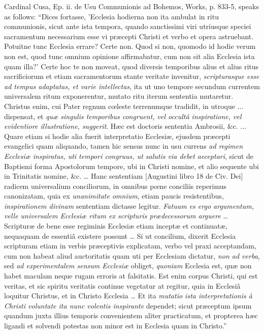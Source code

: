 {Cardinal Cusa, Ep. ii. de Usu Communionis ad Bohemos,
Works, p. 833-5, speaks as follows: ``Dices fortasse, 'Ecclesia
hodierna non ita ambulat in ritu communionis, sicut ante ista tempora,
quando sanctissimi viri utriusque speciei sacramentum necessarium esse
vi præcepti Christi et verbo et opera astruebant. Potuitne tunc
Ecclesia errare? Certe non. Quod si non, quomodo id hodie verum non
est, quod tunc omnium opinione affirmabatur, cum non sit alia Ecclesia
ista quam illa?' Certe hoc te non moveat, quod diversis temporibus
alius et alius ritus sacrificiorum et etiam sacramentorum stante
veritate invenitur, \emph{scripturasque esse ad tempus adaptatas, et
varie intellectas}, ita ut uno tempore secundum currentem
universalem ritum exponerentur, mutato ritu iterum sententia mutaretur.
Christus enim, cui Pater regnum cœleste terrenumque tradidit, in
utroque ... dispensat, et \emph{quæ singulis temporibus congruent, vel
occultâ inspiratione, vel evidentiore illustratione, suggerit}.
Hæc est doctoris sententia Ambrosii, \&c. ... Quare etiam si hodie
alia fuerit interpretatio Ecclesiæ, ejusdem præcepti evangelici quam
aliquando, tamen hic sensus nunc in usu currens \emph{ad regimen
Ecclesiæ inspiratus, uti tempori congruus, ut salutis via debet
aeceptari}, sicut de Baptismi forma Apostolorum tempore, ubi in
Christi nomine, et alio sequente ubi in Trinitatis nomine, \&c. …
Hanc sententiam [Augustini libro 18 de Civ. Dei] radicem universalium
conciliorum, in omnibus pœne conciliis reperimus canonizatam, quia ex
\emph{unanimitate omnium}, etiam paucis resistentibus, \emph{inspirationem
divinam} sententiam dictasse legitur. \emph{Fatuum es ergo argumentum,
velle universalem Ecclesiæ ritum ex scripturis prædecessorum arguere}
… Scripturæ de bene esse regiminis Ecclesiæ etiam inceptæ et
continuatæ, nequaquam de essentiâ existere possunt … Si ut
concilium, dixerit Ecclesia scripturam etiam in verbis præceptivis
explicatam, verbo vel praxi acceptandam, cum non habeat aliud
auctoritatis quam uti per Ecclesiam dictatur, \emph{non ad verba}, sed
\emph{ad experimentalem sensum Ecclesiæ} obliget, \emph{quoniam}
Ecclesia est, quæ non habet maculam neque rugam erroris at falsitatis.
Est enim corpus Christi, qui est veritas, et sic spiritu veritatis
continue vegetatur at regitur, quia in Ecclesiâ loquitur Christus, et
in Christo Ecclesia … Et ita \emph{mutatio ista interpretationis
à Christi voluntate ita nunc volentis inspirante} dependet; sicut
præceptum ipsum quandum juxta illius temporis convenientem aliter
practicatum, et propterea hæc ligandi et solvendi potestas non minor
est in Ecclesia quam in Christo.''}

